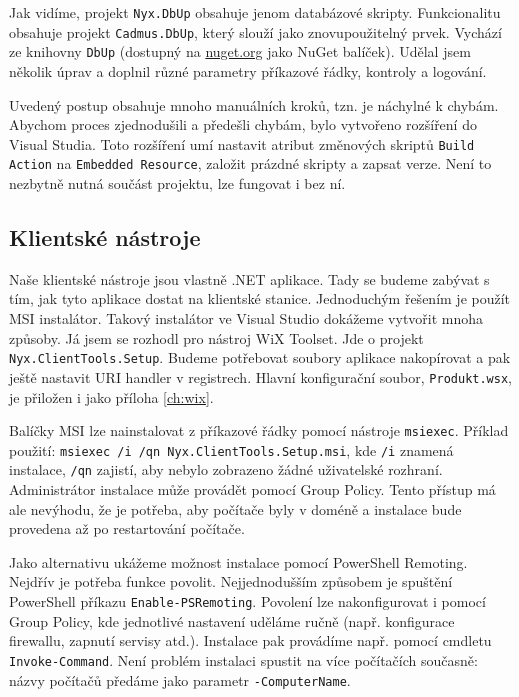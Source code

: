 Jak vidíme, projekt \texttt{Nyx.DbUp} obsahuje jenom databázové skripty. Funkcionalitu obsahuje projekt \texttt{Cadmus.DbUp}, který slouží jako znovupoužitelný prvek. Vychází ze knihovny \texttt{DbUp} (dostupný na \url{nuget.org} jako NuGet balíček). Udělal jsem několik úprav a doplnil různé parametry příkazové řádky, kontroly a logování.

Uvedený postup obsahuje mnoho manuálních kroků, tzn. je náchylné k chybám. Abychom proces zjednodušili a předešli chybám, bylo vytvořeno rozšíření do Visual Studia. Toto rozšíření umí nastavit atribut změnových skriptů \texttt{Build Action} na \texttt{Embedded Resource}, založit prázdné skripty a zapsat verze. Není to nezbytně nutná součást projektu, lze fungovat i bez ní. 

\subsection{Klientské nástroje}
Naše klientské nástroje jsou vlastně .NET aplikace. Tady se budeme zabývat s tím, jak tyto aplikace dostat na klientské stanice. Jednoduchým řešením je použít MSI instalátor. Takový instalátor ve Visual Studio dokážeme vytvořit mnoha způsoby. Já jsem se rozhodl pro nástroj WiX Toolset. Jde o projekt \texttt{Nyx.ClientTools.Setup}. Budeme potřebovat soubory aplikace nakopírovat a pak ještě nastavit URI handler v registrech. Hlavní konfigurační soubor, \texttt{Produkt.wsx}, je přiložen i jako příloha \ref{ch:wix}. 

Balíčky MSI lze nainstalovat z příkazové řádky pomocí nástroje \texttt{msiexec}. Příklad použití: \texttt{msiexec /i /qn Nyx.ClientTools.Setup.msi}, kde \texttt{/i} znamená instalace, \texttt{/qn} zajistí, aby nebylo zobrazeno žádné uživatelské rozhraní. Administrátor instalace může provádět pomocí Group Policy. Tento přístup má ale nevýhodu, že je potřeba, aby počítače byly v doméně a instalace bude provedena až po restartování počítače.

Jako alternativu ukážeme možnost instalace pomocí PowerShell Remoting. Nejdřív je potřeba funkce povolit. Nejjednodušším způsobem je spuštění PowerShell příkazu \texttt{Enable-PSRemoting}. Povolení lze nakonfigurovat i pomocí Group Policy, kde jednotlivé nastavení uděláme ručně (např. konfigurace firewallu, zapnutí servisy atd.). Instalace pak provádíme např. pomocí cmdletu \texttt{Invoke-Command}. Není problém instalaci spustit na více počítačích současně: názvy počítačů předáme jako parametr \texttt{-ComputerName}. 

